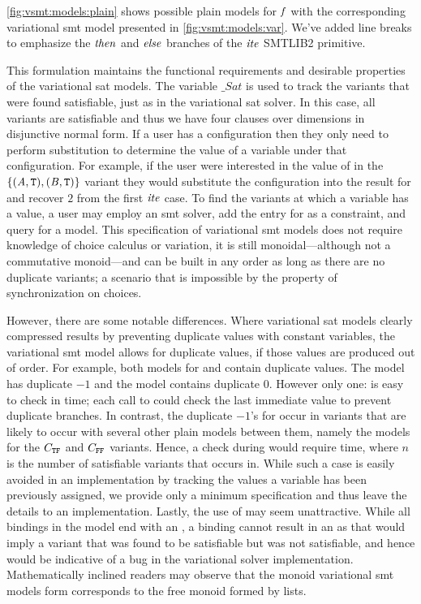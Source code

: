 \autoref{fig:vsmt:models:plain} shows possible plain models for $\mathit{f}$ with
the corresponding variational \ac{smt} model presented in
\autoref{fig:vsmt:models:var}. We've added line breaks to emphasize the
$\mathit{then}$ and $\mathit{else}$ branches of the $\mathit{ite}$ SMTLIB2 primitive.

This formulation maintains the functional requirements and desirable properties
of the variational \ac{sat} models. The variable $\_Sat$ is used to track the
variants that were found satisfiable, just as in the variational \ac{sat}
solver. In this case, all variants are satisfiable and thus we have four clauses
over dimensions in disjunctive normal form. If a user has a configuration then
they only need to perform substitution to determine the value of a variable
under that configuration. For example, if the user were interested in the value
of \iV{} in the $\{(\mathit{A}{}, \texttt{T}{}), (\mathit{B}{}, \texttt{T}{})\}$ variant they would
substitute the configuration into the result for \iV{} and recover $2$ from the
first $\mathit{ite}$ case. To find the variants at which a variable has a value, a
user may employ an \ac{smt} solver, add the entry for \iV{} as a constraint, and
query for a model.
%
This specification of variational \ac{smt} models does not require knowledge of
choice calculus or variation, it is still monoidal---although not a commutative
monoid---and can be built in any order as long as there are no duplicate
variants; a scenario that is impossible by the property of synchronization on
choices.


However, there are some notable differences. Where variational \ac{sat} models
clearly compressed results by preventing duplicate values with constant
variables, the variational \ac{smt} model allows for duplicate values, if those
values are produced out of order. For example, both models for \iV{} and \cV{}
contain duplicate values. The \iV{} model has duplicate $-1$ and the \cV{} model
contains duplicate $0$. However only one: \cV{} is easy to check in 
time; each call to  could check the last immediate value to prevent
duplicate branches. In contrast, the duplicate $-1$'s for \iV{} occur in
variants that are likely to occur with several other plain models between them,
namely the models for the $C_{\texttt{T}\texttt{F}}$ and $C_{\texttt{F}\texttt{F}}$ variants. Hence, a
check during  would require  time, where $n$ is the number
of satisfiable variants that \iV{} occurs in. While such a case is easily
avoided in an implementation by tracking the values a variable has been
previously assigned, we provide only a minimum specification and thus leave the
details to an implementation.
%
Lastly, the use of \undefined{} may seem unattractive. While all bindings in the
model end with an \undefined{}, a binding cannot result in an \undefined{} as
that would imply a variant that was found to be satisfiable but was not
satisfiable, and hence would be indicative of a bug in the variational solver
implementation. Mathematically inclined readers may observe that the monoid
variational \ac{smt} models form corresponds to the free monoid formed by lists.

